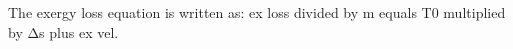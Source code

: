 The exergy loss equation is written as:  
ex loss divided by m equals T0 multiplied by Δs plus ex vel.